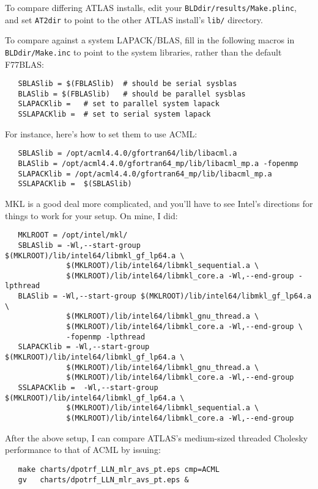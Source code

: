 \documentclass[11pt]{article}
\begin{document}
To compare differing ATLAS installs, edit your {\tt BLDdir/results/Make.plinc},
and set {\tt AT2dir} to point to the other ATLAS install's {\tt lib/} directory.

{\samepage
To compare against a system LAPACK/BLAS, fill in the following macros in 
{\tt BLDdir/Make.inc} to point to the system libraries, rather than
the default F77BLAS:
\begin{verbatim}
   SBLASlib = $(FBLASlib)  # should be serial sysblas
   BLASlib = $(FBLASlib)   # should be parallel sysblas
   SLAPACKlib =   # set to parallel system lapack
   SSLAPACKlib =  # set to serial system lapack
\end{verbatim}
}

{\samepage
For instance, here's how to set them to use ACML:
\begin{verbatim}
   SBLASlib = /opt/acml4.4.0/gfortran64/lib/libacml.a
   BLASlib = /opt/acml4.4.0/gfortran64_mp/lib/libacml_mp.a -fopenmp
   SLAPACKlib = /opt/acml4.4.0/gfortran64_mp/lib/libacml_mp.a
   SSLAPACKlib =  $(SBLASlib)
\end{verbatim}
}

{\samepage
MKL is a good deal more complicated, and you'll have to see Intel's
directions for things to work for your setup.  On mine, I did:
\begin{verbatim}
   MKLROOT = /opt/intel/mkl/
   SBLASlib = -Wl,--start-group $(MKLROOT)/lib/intel64/libmkl_gf_lp64.a \
              $(MKLROOT)/lib/intel64/libmkl_sequential.a \
              $(MKLROOT)/lib/intel64/libmkl_core.a -Wl,--end-group -lpthread
   BLASlib = -Wl,--start-group $(MKLROOT)/lib/intel64/libmkl_gf_lp64.a \
              $(MKLROOT)/lib/intel64/libmkl_gnu_thread.a \
              $(MKLROOT)/lib/intel64/libmkl_core.a -Wl,--end-group \
              -fopenmp -lpthread
   SLAPACKlib = -Wl,--start-group $(MKLROOT)/lib/intel64/libmkl_gf_lp64.a \
              $(MKLROOT)/lib/intel64/libmkl_gnu_thread.a \
              $(MKLROOT)/lib/intel64/libmkl_core.a -Wl,--end-group
   SSLAPACKlib =  -Wl,--start-group $(MKLROOT)/lib/intel64/libmkl_gf_lp64.a \
              $(MKLROOT)/lib/intel64/libmkl_sequential.a \
              $(MKLROOT)/lib/intel64/libmkl_core.a -Wl,--end-group
\end{verbatim}
}

After the above setup, I can compare ATLAS's medium-sized threaded
Cholesky performance to that of ACML by issuing:
\begin{verbatim}
   make charts/dpotrf_LLN_mlr_avs_pt.eps cmp=ACML
   gv   charts/dpotrf_LLN_mlr_avs_pt.eps &
\end{verbatim}
\end{document}
